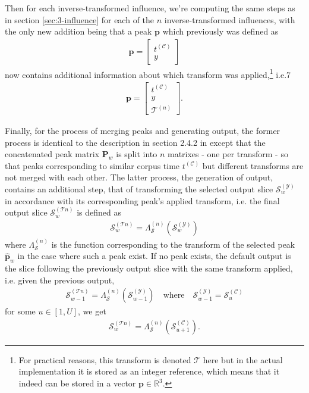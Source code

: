 \noindent Then for each inverse-transformed influence, we're computing the same steps as in section \ref{sec:3-influence} for each of the $n$ inverse-transformed influences, with the only new addition being that a peak $\bm p$ which previously was defined as \begin{align}
		\bm p = \begin{bmatrix}
			t^{(\mathcal C)} \\ y
		\end{bmatrix}
	\end{align}
	now contains additional information about which transform was applied,\footnote{For practical reasons, this transform is denoted $\mathcal T$ here but in the actual implementation it is stored as an integer reference, which means that it indeed can be stored in a vector $\bm p \in \mathbb R^{3}$.} i.e.7
	\begin{align}\label{eq:peak-transform}
		\bm p = \begin{bmatrix}
 			t^{(\mathcal C)} \\ y \\ \mathcal T^{(n)}		
	    \end{bmatrix}.
	\end{align}

Finally, for the process of merging peaks and generating output, the former process is identical to the description in section 2.4.2 in \cite{borg2020dynamic} except that the concatenated peak matrix $\bm P_w$ is split into $n$ matrixes -  one per transform - so that peaks corresponding to similar corpus time $t^{(\mathcal C)}$ but different transforms are not merged with each other. The latter process, the generation of output, contains an additional step, that of transforming the selected output slice $\mathcal S^{(\mathcal Y)}_w$ in accordance with its corresponding peak's applied transform, i.e. the final output slice $\mathcal S^{(\mathcal Tn)}_w$ is defined as
	\begin{align}
		\mathcal S^{(\mathcal Tn)}_w = \Lambda^{(n)}_{\mathcal S}\left(\mathcal S^{(\mathcal Y)}_w\right)
	\end{align}
	where $\Lambda^{(n)}_{\mathcal S}$ is the function corresponding to the transform of the selected peak $\bm {\hat p}_w$ in the case where such a peak exist. If no peak exists, the default output is the slice following the previously output slice with the same transform applied, i.e. given the previous output,
		\begin{align}
					\mathcal S^{(\mathcal Tn)}_{w-1} = \Lambda^{(n)}_{\mathcal S}\left(\mathcal S^{(\mathcal Y)}_{w-1}\right)			\quad \text{where} \quad \mathcal S^{(\mathcal Y)}_{w-1} = \mathcal S^{(\mathcal C)}_u
		\end{align}
		for some $u \in [1, U]$, we get
		\begin{align}
			\mathcal S^{(\mathcal Tn)}_w = \Lambda^{(n)}_\mathcal S \left(\mathcal S^{(\mathcal C)}_{u+1}\right).
		\end{align}
		
